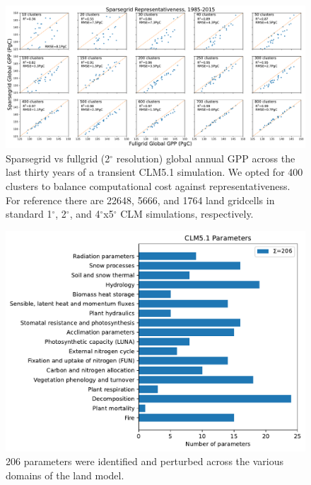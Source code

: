 \documentclass[draft]{agujournal2019}
\begin{document}
\begin{figure}[h]
\centering
\includegraphics[width=40pc]{../figs/sparsegrid_gpp.pdf}
\caption{Sparsegrid vs fullgrid (2$^{\circ}$ resolution) global annual GPP across the last thirty years of a transient CLM5.1 simulation. We opted for 400 clusters to balance computational cost against representativeness. For reference there are 22648, 5666, and 1764 land gridcells in standard 1$^{\circ}$, 2$^{\circ}$, and 4$^{\circ}$x5$^{\circ}$ CLM simulations, respectively.}
\label{}
\end{figure}

\begin{figure}[h]
\centering
\includegraphics[width=30pc]{../figs/bar.pdf}
\caption{206 parameters were identified and perturbed across the various domains of the land model.}
\label{fig:params}
\end{figure}
\end{document}
